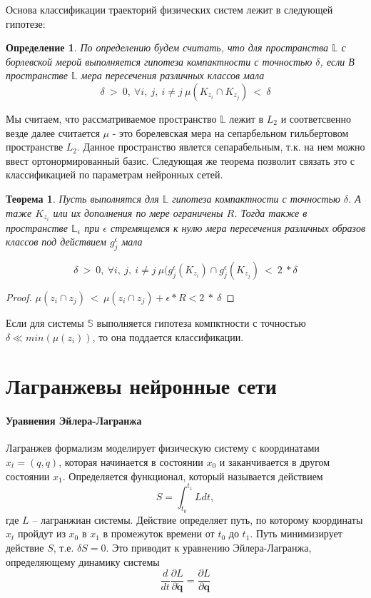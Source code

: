 \documentclass[12pt, twoside]{article}
\newtheorem{def1}{Определение}
\newtheorem{theorem1}{Теорема}
\begin{document}
Основа классификации траекторий физических систем лежит в следующей гипотезе:

\begin{def1} 

По определению будем считать, что для пространства $\mathbb{L}$ с борлевской мерой выполняется гипотеза компактности с точностью $\delta$, если
В пространстве $\mathbb{L}$ мера пересечения различных классов мала
\[\delta\ >\ 0,\ \forall i,\ j,\ i\neq j\ \mu({K}_{z_i}\cap {K}_{z_j})\ <\ \delta\]
\end{def1}
Мы считаем, что рассматриваемое пространство $\mathbb{L}$ лежит в $L_2$ и соответсвенно везде далее считается $\mu$ - это борелевская мера на сепарбельном гильбертовом пространстве $L_2$. \cite{funcan} Данное пространство явлется сепарабельным, т.к. на нем можно ввест ортонормированный базис. 
Следующая же теорема позволит связать это с классификацией по параметрам нейронных сетей.
\begin{theorem1}
Пусть выполнятся для $\mathbb{L}$ гипотеза компактности с точностью $\delta$. А таже ${K}_{z_i}$ или их дополнения по мере ограничены $R$. Тогда также в пространстве $\mathbb{L}_{\epsilon}$ при $\epsilon$ стремящемся к нулю мера пересечения различных образов классов под действием $g_j^{\epsilon}$ мала

\[\delta\ >\ 0,\ \forall i,\ j,\ i\neq j\ \mu(g_j^{\epsilon}({K}_{z_i})\cap g_j^{\epsilon}({K}_{z_j})\ <\ 2\ *\delta\]

\end{theorem1}

\begin{proof}
 $\mu(z_i\cap z_j)\ <\ \mu(z_i\cap z_j) + \epsilon * R < 2\ *\ \delta $
\end{proof}


Если для системы $\mathbb{S}$ выполняется гипотеза компктности с точностью $\delta \ll min(\mu(z_{i}))$, то она поддается классификации.

\section{Лагранжевы нейронные сети}

 
\paragraph{Уравнения Эйлера-Лагранжа}
Лагранжев формализм моделирует физическую систему с координатами $x_t = (q, \dot{q})$, которая начинается в состоянии $x_0$ и заканчивается в другом состоянии $x_1$. Определяется функционал, который называется действием
$$S=\int_{t_{0}}^{t_{1}} L d t,$$
 где $L$ -- лагранжиан системы. Действие определяет путь, по которому координаты $x_t$ пройдут из $x_0$ в $x_1$ в промежуток времени от $t_0$ до $t_1$. Путь минимизирует действие $S$, т.е. $\delta S = 0$. Это приводит к уравнению Эйлера-Лагранжа, определяющему динамику системы
$$\frac{d}{d t} \frac{\partial L}{\partial \dot{\mathbf{q}}}=\frac{\partial L}{\partial \mathbf{q}}$$
\end{document}
